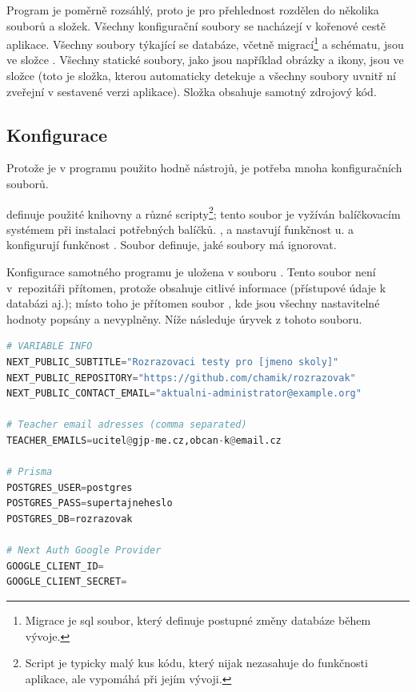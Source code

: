 Program je poměrně rozsáhlý, proto je pro přehlednost rozdělen do několika souborů a složek. Všechny konfigurační soubory se nacházejí v kořenové cestě aplikace. Všechny soubory týkající se databáze, včetně migrací\footnote{Migrace je sql soubor, který definuje postupné změny databáze během vývoje.} a schématu, jsou ve složce . Všechny statické soubory, jako jsou například obrázky a ikony, jsou ve složce  (toto je složka, kterou  automaticky detekuje a všechny soubory uvnitř ní zveřejní v sestavené verzi aplikace). Složka  obsahuje samotný zdrojový kód.

\subsection{Konfigurace}
\label{sec:config}

Protože je v programu použito hodně nástrojů, je potřeba mnoha konfiguračních souborů.

 definuje použité knihovny a různé scripty\footnote{Script je typicky malý kus kódu, který nijak nezasahuje do funkčnosti aplikace, ale vypomáhá při jejím vývoji.}; tento soubor je vyžíván balíčkovacím systémem  při instalaci potřebných balíčků. ,  a  nastavují funkčnost u.  a  konfigurují funkčnost . Soubor  definuje, jaké soubory má  ignorovat.

Konfigurace samotného programu je uložena v souboru . Tento soubor není v~repozitáři přítomen, protože obsahuje citlivé informace (přístupové údaje k databázi aj.); místo toho je přítomen soubor , kde jsou všechny nastavitelné hodnoty popsány a nevyplněny. Níže následuje úryvek z tohoto souboru.

\begin{lstlisting}[language=Python,caption={Úryvek \M{/.env}; ukázka konfiguračního souboru programu.}]
# VARIABLE INFO
NEXT_PUBLIC_SUBTITLE="Rozrazovaci testy pro [jmeno skoly]"
NEXT_PUBLIC_REPOSITORY="https://github.com/chamik/rozrazovak"
NEXT_PUBLIC_CONTACT_EMAIL="aktualni-administrator@example.org"

# Teacher email adresses (comma separated)
TEACHER_EMAILS=ucitel@gjp-me.cz,obcan-k@email.cz

# Prisma
POSTGRES_USER=postgres
POSTGRES_PASS=supertajneheslo
POSTGRES_DB=rozrazovak

# Next Auth Google Provider
GOOGLE_CLIENT_ID=
GOOGLE_CLIENT_SECRET=
\end{lstlisting}

